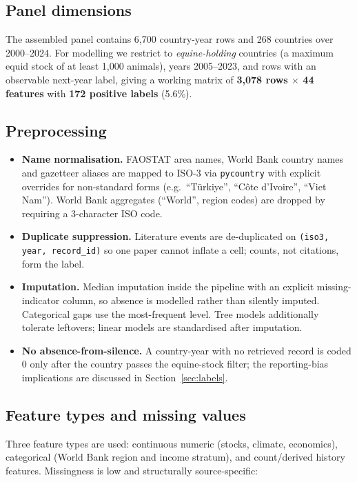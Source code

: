 \documentclass[11pt]{article}
\begin{document}
\subsection{Panel dimensions}

The assembled panel contains 6,700 country-year rows and
268 countries over 2000--2024. For modelling we restrict to
\emph{equine-holding} countries (a maximum equid stock of at least 1{,}000 animals), years
2005--2023, and rows with an observable next-year label, giving a working matrix of
\textbf{3,078 rows $\times$ 44 features} with
\textbf{172 positive labels} (5.6\%).

\subsection{Preprocessing}
\begin{itemize}
  \item \textbf{Name normalisation.} FAOSTAT area names, World Bank country names and gazetteer
        aliases are mapped to ISO-3 via \texttt{pycountry} with explicit overrides for
        non-standard forms (e.g.\ ``T\"urkiye'', ``C\^ote d'Ivoire'', ``Viet Nam'').
        World Bank aggregates (``World'', region codes) are dropped by requiring a
        3-character ISO code.
  \item \textbf{Duplicate suppression.} Literature events are de-duplicated on
        \texttt{(iso3, year, record\_id)} so one paper cannot inflate a cell; counts, not
        citations, form the label.
  \item \textbf{Imputation.} Median imputation inside the pipeline with an explicit
        missing-indicator column, so absence is modelled rather than silently imputed.
        Categorical gaps use the most-frequent level. Tree models additionally tolerate
        leftovers; linear models are standardised after imputation.
  \item \textbf{No absence-from-silence.} A country-year with no retrieved record is coded
        0 only after the country passes the equine-stock filter; the reporting-bias implications
        are discussed in Section~\ref{sec:labels}.
\end{itemize}

\subsection{Feature types and missing values}

Three feature types are used: continuous numeric (stocks, climate, economics),
categorical (World Bank region and income stratum), and count/derived history features.
Missingness is low and structurally source-specific:
\end{document}
